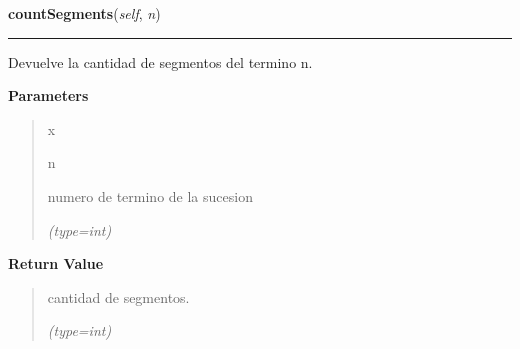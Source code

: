 \hspace{.8\funcindent}\begin{boxedminipage}{\funcwidth}

    \raggedright \textbf{countSegments}(\textit{self}, \textit{n})

    \vspace{-1.5ex}

    \rule{\textwidth}{0.5\fboxrule}
\setlength{\parskip}{2ex}
    Devuelve la cantidad de segmentos  del termino n.

\setlength{\parskip}{1ex}
      \textbf{Parameters}
      \vspace{-1ex}

      \begin{quote}
        \begin{Ventry}{x}

          \item[n]

          numero de termino de la sucesion

            {\it (type=int)}

        \end{Ventry}

      \end{quote}

      \textbf{Return Value}
    \vspace{-1ex}

      \begin{quote}
      cantidad de segmentos.

      {\it (type=int)}

      \end{quote}

    \end{boxedminipage}

    \label{FractalZE:cantor:Cantor:segmentLength}

    \vspace{0.5ex}

